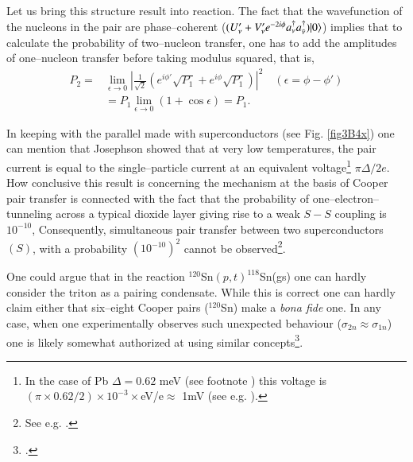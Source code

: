 \begin{subappendices}
 
 Let us bring this structure result into reaction. The fact that the wavefunction of the nucleons in the pair are phase--coherent ($(U'_\nu+V'_\nu e^{-2i\phi} a_\nu^\dagger a_{\bar{\nu}}^\dagger)|{0} \rangle$) implies that to calculate the probability of two--nucleon transfer, one has to add the amplitudes of one--nucleon transfer before taking modulus squared, that is,
 \begin{align}\label{eq3B13}
\nonumber P_2=&\lim_{\epsilon\rightarrow 0}\left|\frac{1}{\sqrt{2}}\left(e^{i\phi'}\sqrt{P_1}+e^{i\phi}\sqrt{P_1}\right)\right|^2\quad(\epsilon=\phi-\phi')\\
&=P_1\lim_{\epsilon\rightarrow0}(1+\cos \epsilon)=P_1.
 \end{align}  


In keeping with the parallel made with superconductors (see Fig. \ref{fig3B4x}) one can mention that Josephson showed that at very low temperatures, the pair current is equal to the single--particle current at an equivalent voltage\footnote{In the case of Pb $\Delta=0.62$ meV (see footnote \footnotemark[\ref{foot75}]) this voltage is $(\pi\times0.62/2)\times 10^{-3}\times$eV/e$\approx$ 1mV (see e.g. \cite{McDonald:01}).} $\pi\Delta/2e$. How conclusive this result is concerning the mechanism at the basis of Cooper pair transfer is connected with the fact that the probability of one--electron--tunneling across a typical dioxide layer giving rise to a weak $S-S$ coupling is $10^{-10}$, Consequently, simultaneous pair transfer between two superconductors $(S)$, with a probability  $(10^{-10})^2$ cannot be observed\footnote{See e.g. \cite{McDonald:01}.}.


One could argue that in the reaction $^{120}$Sn$(p,t)^{118}$Sn(gs) one can hardly consider the triton as a pairing condensate. While this is correct one can hardly claim either that six--eight Cooper pairs ($^{120}$Sn) make a \textit{bona fide} one. In any case, when one experimentally observes such unexpected behaviour ($\sigma_{2n}\approx\sigma_{1n}$) one is likely somewhat authorized at using similar concepts\footnote{\cite{Anderson:72}.}.

\end{subappendices}
